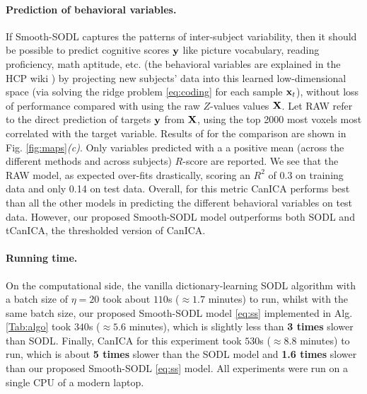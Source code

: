 \paragraph{Prediction of behavioral variables.}
If Smooth-SODL captures the patterns of inter-subject variability, then it should be possible to predict cognitive scores $\mathbf{y}$ like picture vocabulary, reading proficiency, math aptitude, etc. (the behavioral variables are explained in the HCP wiki   \citep{hcpwiki}) by projecting new subjects' data into this learned low-dimensional space (via solving the ridge problem \eqref{eq:coding} for each sample $\mathbf{x}_t$), without loss of performance compared with using the raw $Z$-values values $\mathbf{X}$. Let RAW refer to the direct prediction of targets $\mathbf{y}$ from $\mathbf{X}$, using the top 2000 most voxels most correlated with the target variable. Results of for the comparison are shown in Fig. \ref{fig:maps}\textit{(c)}.  Only variables predicted with a a positive mean (across the different methods and across subjects) $R$-score are reported.
We see that the RAW model, as expected over-fits drastically, scoring an $R^2$ of 0.3 on training data and only 0.14 on test data. Overall, for this metric CanICA performs best than all the other models in predicting the different behavioral variables on test data. However, our proposed Smooth-SODL model outperforms both SODL   \citep{mairal2010} and tCanICA, the thresholded version of CanICA.

  
\paragraph{Running time.} On the computational
side, the vanilla dictionary-learning
SODL algorithm   \citep{mairal2010} with a batch size of
$\eta = 20$ took about $110$s ($\approx 1.7$ minutes) to
run, whilst with the same batch size, our proposed
Smooth-SODL model \eqref{eq:ss} implemented in Alg. \ref{Tab:algo} took
$340$s ($\approx 5.6$ minutes), which is slightly less than \textbf{3 times}
slower than SODL.  Finally, CanICA   \citep{varoquaux2010group} for this experiment
took $530$s ($\approx 8.8$ minutes) to run, which is about \textbf{5 times} slower
than the SODL model and \textbf{1.6 times} slower than our proposed Smooth-SODL
\eqref{eq:ss} model.
All experiments were run on a single CPU of a modern laptop.

